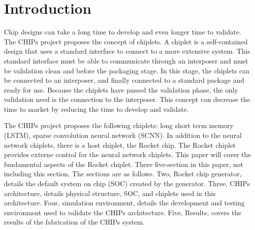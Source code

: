 \documentclass[../main.tex]{subfiles}
\begin{document}
\section{Introduction}
Chip designs can take a long time to develop and even longer time to validate. The CHIPs project proposes the concept of chiplets. A chiplet is a self-contained design that uses a standard interface to connect to a more extensive system. This standard interface must be able to communicate through an interposer and must be validation clean and before the packaging stage. In this stage, the chiplets can be connected to an interposer, and finally connected to a standard package and ready for use. Because the chiplets have passed the validation phase, the only validation need is the connection to the interposer. This concept can decrease the time to market by reducing the time to develop and validate. 

The CHIPs project proposes the following chiplets:  long short term memory (LSTM), sparse convolution neural network (SCNN). In addition to the neural network chiplets, there is a host chiplet, the Rocket chip. The Rocket chiplet provides externe control for the neural network chiplets. This paper will cover the fundamental aspects of the Rocket chiplet. There five-section in this paper, not including this section. The sections are as follows. Two, Rocket chip generator, details the default system on chip (SOC) created by the generator. Three, CHIPs architecture, details physical structure, SOC, and chiplets used in this architecture. Four, simulation environment, details the development and testing environment used to validate the CHIPs architecture. Five, Results, covers the results of the fabrication of the CHIPs system.
\end{document}
